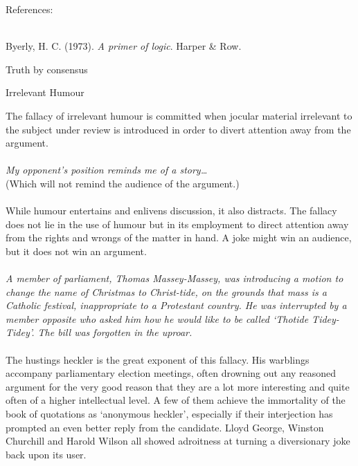 \documentclass[a4paper,12pt,single,pdftex]{scrartcl}
\begin{document}
    References:

    
      
        
      \\

      
        
          Byerly, H. C. (1973). {\it A primer of logic}. Harper \& Row.
        
      
    
  

Truth by consensus

Irrelevant Humour
    
      The fallacy of irrelevant humour is committed when jocular material irrelevant to the subject under review is introduced in order to divert attention away from the argument.
    \\

    
       
    \\

    
      {\em My opponent’s position reminds me of a story…}
    \\

    
      (Which will not remind the audience of the argument.)
    \\

    
       
    \\

    
      While humour entertains and enlivens discussion, it also distracts. The fallacy does not lie in the use of humour but in its employment to direct attention away from the rights and wrongs of the matter in hand. A joke might win an audience, but it does not win an argument.
    \\

    
       
    \\

    
      {\em A member of parliament, Thomas Massey-Massey, was introducing a motion to change the name of Christmas to Christ-tide, on the grounds that mass is a Catholic festival, inappropriate to a Protestant country. He was interrupted by a member opposite who asked him how he would like to be called ‘Thotide Tidey-Tidey’. The bill was forgotten in the uproar.}
    \\

    
       
    \\

    
      The hustings heckler is the great exponent of this fallacy. His warblings accompany parliamentary election meetings, often drowning out any reasoned argument for the very good reason that they are a lot more interesting and quite often of a higher intellectual level. A few of them achieve the immortality of the book of quotations as ‘anonymous heckler’, especially if their interjection has prompted an even better reply from the candidate. Lloyd George, Winston Churchill and Harold Wilson all showed adroitness at turning a diversionary joke back upon its user.
    \\
\end{document}
